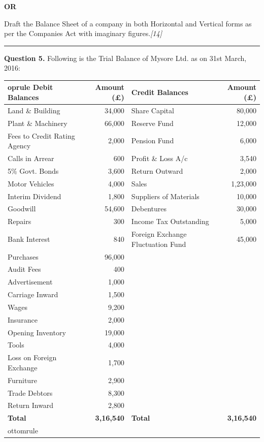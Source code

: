 \documentclass[11pt,a4paper]{article}
\newcommand{\pts}[1]{\hfill   \textit{[#1]}}
\begin{document}
\centerline{   \textbf{OR}}

Draft the Balance Sheet of a company in both Horizontal and Vertical forms as per the Companies Act with imaginary figures.\pts{14}

\medskip\rule{\linewidth}{0.2pt}


\newpage




\noindent   \textbf{Question 5.}
Following is the Trial Balance of Mysore Ltd. as on 31st March, 2016:


\begin{center}

\begin{tabular}{lr|lr}
 oprule
   \textbf{Debit Balances} &   \textbf{Amount (\pounds)} &   \textbf{Credit Balances} &   \textbf{Amount (\pounds)} \\
\midrule
Land \& Building & 34,000 & Share Capital & 80,000 \\
Plant \& Machinery & 66,000 & Reserve Fund & 12,000 \\
Fees to Credit Rating Agency & 2,000 & Pension Fund & 6,000 \\
Calls in Arrear & 600 & Profit \& Loss A/c & 3,540 \\
5\% Govt. Bonds & 3,600 & Return Outward & 2,000 \\
Motor Vehicles & 4,000 & Sales & 1,23,000 \\
Interim Dividend & 1,800 & Suppliers of Materials & 10,000 \\
Goodwill & 54,600 & Debentures & 30,000 \\
Repairs & 300 & Income Tax Outstanding & 5,000 \\
Bank Interest & 840 & Foreign Exchange Fluctuation Fund & 45,000 \\
Purchases & 96,000 & & \\
Audit Fees & 400 & & \\
Advertisement & 1,000 & & \\
Carriage Inward & 1,500 & & \\
Wages & 9,200 & & \\
Insurance & 2,000 & & \\
Opening Inventory & 19,000 & & \\
Tools & 4,000 & & \\
Loss on Foreign Exchange & 1,700 & & \\
Furniture & 2,900 & & \\
Trade Debtors & 8,300 & & \\
Return Inward & 2,800 & & \\
\midrule
   \textbf{Total} &   \textbf{3,16,540} &   \textbf{Total} &   \textbf{3,16,540} \\
ottomrule
\end{tabular}
\end{center}
\end{document}
